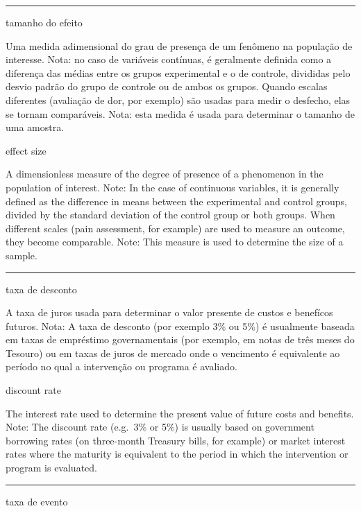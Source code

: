 \documentclass[
]{book}
\begin{document}
\begin{center}\rule{0.5\linewidth}{0.5pt}\end{center}

tamanho do efeito

Uma medida adimensional do grau de presença de um fenômeno na população de interesse. Nota: no caso de variáveis contínuas, é geralmente definida como a diferença das médias entre os grupos experimental e o de controle, divididas pelo desvio padrão do grupo de controle ou de ambos os grupos. Quando escalas diferentes (avaliação de dor, por exemplo) são usadas para medir o desfecho, elas se tornam comparáveis. Nota: esta medida é usada para determinar o tamanho de uma amostra.

effect size

A dimensionless measure of the degree of presence of a phenomenon in the population of interest. Note: In the case of continuous variables, it is generally defined as the difference in means between the experimental and control groups, divided by the standard deviation of the control group or both groups. When different scales (pain assessment, for example) are used to measure an outcome, they become comparable. Note: This measure is used to determine the size of a sample.

\begin{center}\rule{0.5\linewidth}{0.5pt}\end{center}

taxa de desconto

A taxa de juros usada para determinar o valor presente de custos e benefícos futuros. Nota: A taxa de desconto (por exemplo 3\% ou 5\%) é usualmente baseada em taxas de empréstimo governamentais (por exemplo, em notas de três meses do Tesouro) ou em taxas de juros de mercado onde o vencimento é equivalente ao período no qual a intervenção ou programa é avaliado.

discount rate

The interest rate used to determine the present value of future costs and benefits. Note: The discount rate (e.g.~3\% or 5\%) is usually based on government borrowing rates (on three-month Treasury bills, for example) or market interest rates where the maturity is equivalent to the period in which the intervention or program is evaluated.

\begin{center}\rule{0.5\linewidth}{0.5pt}\end{center}

taxa de evento
\end{document}
